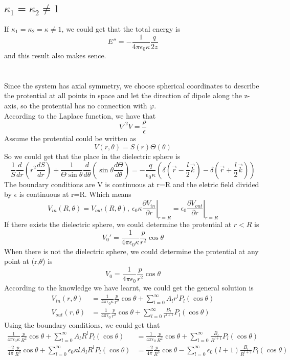 \documentclass[10.5pt]{article}
\begin{document}
\subsection{$\kappa_1=\kappa_2\neq 1$}
If $\kappa_1=\kappa_2=\kappa\neq 1$, we could get that the total energy is $$E''=-\frac{1}{4\pi\epsilon_0\kappa}\frac{q}{2z}$$\indent
and this result also makes sence.

\section{}
Since the system has axial symmetry, we choose spherical coordinates to describe the protential at all points in space and let the direction of dipole along the z-axis, so the protential has no connection with $\varphi$.\\\indent
According to the Laplace function, we have that$$\nabla^2V = \frac{\rho}{\epsilon}$$\indent
Assume the protential could be written as$$V(r,\theta) = S(r) \Theta (\theta)$$\indent
So we could get that the place in the dielectric sphere is $$\frac{1}{S}\frac{d}{dr}\left(r^2\frac{dS}{dr}\right) + \frac{1}{\Theta \sin\theta}\frac{d}{d\theta}\left(\sin\theta \frac{d\Theta}{d\theta}\right) = -\frac{q}{\epsilon_0\kappa}\left(\delta\left(\vec{r}-\frac{l}{2}\vec{k}\right)-\delta\left(\vec{r}+\frac{l}{2}\vec{k}\right)\right)$$\indent
The boundary conditions are V is continuous at r=R and the eletric field divided by $\epsilon$ is continuous at r=R. Which means $$V_{in}(R,\theta)=V_{out}(R,\theta),~\epsilon_0\kappa\left.\frac{\partial V_{in}}{\partial r}\right\rvert_{r=R}=\epsilon_0\left.\frac{\partial V_{out}}{\partial r}\right\rvert_{r=R}$$\indent
If there exists the dielectric sphere, we could determine the protential at $r<R$ is $$V_0'=\frac{1}{4\pi\epsilon_0\kappa}\frac{p}{r^2}\cos\theta$$\indent
When there is not the dielectric sphere, we could determine the protential at any point at (r,$\theta$) is $$V_0=\frac{1}{4\pi\epsilon_0}\frac{p}{r^2}\cos\theta$$\indent
According to the knowledge we have learnt, we could get the general solution is $$\begin{aligned}
    V_{in}(r,\theta)&=\frac{1}{4\pi\epsilon_0\kappa}\frac{p}{r^2}\cos\theta + \sum_{l=0}^{\infty} A_lr^lP_l(\cos\theta)\\
    V_{out}(r,\theta)&=\frac{1}{4\pi\epsilon_0}\frac{p}{r^2}\cos\theta + \sum_{l=0}^{\infty}\frac{B_l}{r^{l+1}}P_l(\cos\theta)
\end{aligned}$$\indent
Using the boundary conditions, we could get that $$\begin{aligned}
    \frac{1}{4\pi\epsilon_0\kappa}\frac{p}{R^2}\cos\theta + \sum_{l=0}^{\infty} A_lR^lP_l(\cos\theta)&=\frac{1}{4\pi\epsilon_0}\frac{p}{R^2}\cos\theta + \sum_{l=0}^{\infty}\frac{B_l}{R^{l+1}}P_l(\cos\theta)\\
    \frac{-2}{4\pi}\frac{p}{R^3}\cos\theta + \sum_{l=0}^{\infty} \epsilon_0\kappa lA_lR^lP_l(\cos\theta)&=\frac{-2}{4\pi}\frac{p}{R^3}\cos\theta - \sum_{l=0}^{\infty} \epsilon_0 (l+1)\frac{B_l}{R^{l+2}}P_l(\cos\theta)
\end{aligned}$$\indent
\end{document}
